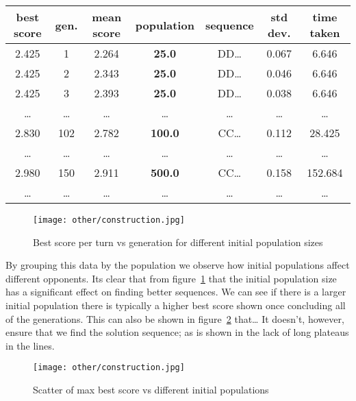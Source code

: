 \begin{center}
    \begin{tabular}{|c|c|c|c|c|c|c|} 
        \hline
        best score & gen. & mean score & population & sequence & std dev. & time taken \\
        \hline
        2.425 & 1 & 2.264 & \textbf{25.0} & DD\ldots & 0.067 & 6.646\\
        2.425 & 2 & 2.343 & \textbf{25.0} & DD\ldots & 0.046 & 6.646\\
        2.425 & 3 & 2.393 & \textbf{25.0} & DD\ldots & 0.038 & 6.646\\
        \ldots  & \ldots  & \ldots  & \ldots  & \ldots  & \ldots  & \ldots \\
        2.830 & 102 & 2.782 & \textbf{100.0} & CC\ldots & 0.112 & 28.425\\
        \ldots  & \ldots  & \ldots  & \ldots  & \ldots  & \ldots  & \ldots \\
        2.980 & 150 & 2.911 & \textbf{500.0} & CC\ldots & 0.158 & 152.684\\
        \ldots  & \ldots  & \ldots  & \ldots  & \ldots  & \ldots  & \ldots \\
        \hline
        \end{tabular}
\end{center}


\begin{figure}
    \texttt{[image: other/construction.jpg]}
    \caption{Best score per turn vs generation for different initial population sizes}\label{fig:INIT-POP-bs-v-gens-all}
\end{figure}

By grouping this data by the population we observe how initial populations affect different opponents. 
Its clear that from figure~\ref{fig:INIT-POP-bs-v-gens-all} that the initial population size has a significant effect on finding better sequences.
We can see if there is a larger initial population there is typically a higher best score shown once concluding all of the generations.
This can also be shown in figure~\ref{fig:INIT-POP-max-bs-v-init-pop-all} that\ldots
It doesn't, however, ensure that we find the solution sequence; as is shown in the lack of long plateaus in the lines.\\

\begin{figure}
    \texttt{[image: other/construction.jpg]}
    \caption{Scatter of max best score vs different initial populations}\label{fig:INIT-POP-max-bs-v-init-pop-all}
\end{figure}

